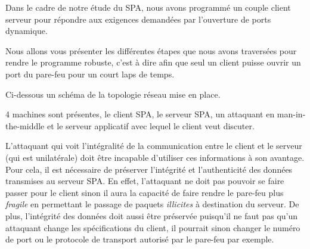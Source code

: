 Dans le cadre de notre étude du SPA, nous avons programmé un couple client serveur pour répondre aux exigences demandées par l'ouverture de ports dynamique.

Nous allons vous présenter les différentes étapes que nous avons traversées pour rendre le programme robuste, c'est à dire afin que seul un client puisse ouvrir un port du pare-feu pour un court laps de temps.

Ci-dessous un schéma de la topologie réseau mise en place.


4 machines sont présentes, le client SPA, le serveur SPA, un attaquant en man-in-the-middle et le serveur applicatif avec lequel le client veut discuter.

L'attaquant qui voit l'intégralité de la communication entre le client et le serveur (qui est unilatérale) doit être incapable d'utiliser ces informations à son avantage.
Pour cela, il est nécessaire de préserver l'intégrité et l'authenticité des données transmises au serveur SPA. 
En effet, l'attaquant ne doit pas pouvoir se faire passer pour le client sinon il aura la capacité de faire rendre le pare-feu plus \emph{fragile} en permettant le passage de paquets \emph{illicites} à destination du serveur.
De plus, l'intégrité des données doit aussi être préservée puisqu'il ne faut pas qu'un attaquant change les spécifications du client, il pourrait sinon changer le numéro de port ou le protocole de transport autorisé par le pare-feu par exemple. 
